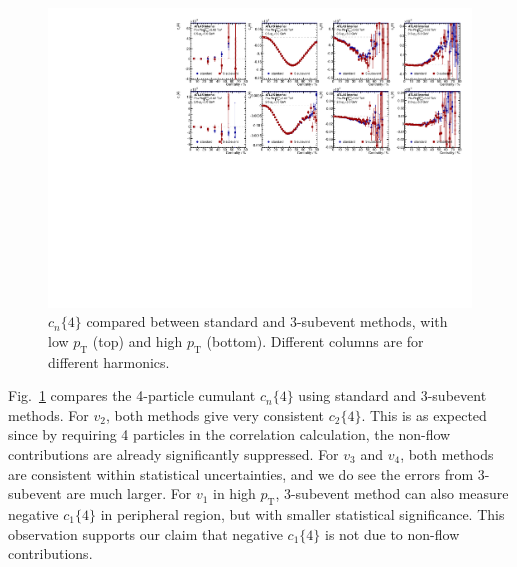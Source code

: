 \begin{figure}[H]
\centering
\includegraphics[width=.95\linewidth]{figs/sec_result/forQM/mtd_c4.pdf}
\caption{$c_n\{4\}$ compared between standard and 3-subevent methods, with low $p_\text{T}$ (top) and high $p_\text{T}$ (bottom). Different columns are for different harmonics.}
\label{fig:result_mtd_c4}
\end{figure}
Fig.~\ref{fig:result_mtd_c4} compares the 4-particle cumulant $c_n\{4\}$ using standard and 3-subevent methods. For $v_2$, both methods give very consistent $c_2\{4\}$. This is as expected since by requiring 4 particles in the correlation calculation, the non-flow contributions are already significantly suppressed. For $v_3$ and $v_4$, both methods are consistent within statistical uncertainties, and we do see the errors from 3-subevent are much larger. For $v_1$ in high $p_\text{T}$, 3-subevent method can also measure negative $c_1\{4\}$ in peripheral region, but with smaller statistical significance. This observation supports our claim that negative $c_1\{4\}$ is not due to non-flow contributions.

